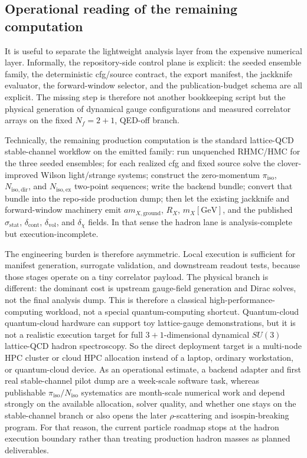 \documentclass[11pt]{article}
\begin{document}
\subsection{Operational reading of the remaining computation}

It is useful to separate the lightweight analysis layer from the expensive numerical layer.
Informally, the repository-side control plane is explicit: the seeded ensemble family, the
deterministic cfg/source contract, the export manifest, the jackknife evaluator, the forward-window
selector, and the publication-budget schema are all explicit. The missing step is therefore not
another bookkeeping script but the physical generation of dynamical gauge configurations and
measured correlator arrays on the fixed \(N_f=2+1\), QED-off branch.

Technically, the remaining production computation is the standard lattice-QCD stable-channel
workflow on the emitted family: run unquenched RHMC/HMC for the three seeded ensembles; for each
realized cfg and fixed source solve the clover-improved Wilson light/strange systems; construct the
zero-momentum \(\pi_{\mathrm{iso}}\), \(N_{\mathrm{iso,dir}}\), and \(N_{\mathrm{iso,ex}}\)
two-point sequences; write the backend bundle; convert that bundle into the repo-side production
dump; then let the existing jackknife and forward-window machinery emit
\(a m_{X,\mathrm{ground}}\), \(R_X\), \(m_X[\mathrm{GeV}]\), and the published
\(\sigma_{\mathrm{stat}}\), \(\delta_{\mathrm{cont}}\), \(\delta_{\mathrm{vol}}\), and
\(\delta_{\chi}\) fields. In that sense the hadron lane is analysis-complete but
execution-incomplete.

The engineering burden is therefore asymmetric. Local execution is sufficient for manifest
generation, surrogate validation, and downstream readout tests, because those stages operate on a
tiny correlator payload. The physical branch is different: the dominant cost is upstream
gauge-field generation and Dirac solves, not the final analysis dump. This is therefore a classical
high-performance-computing workload, not a special quantum-computing shortcut. Quantum-cloud
quantum-cloud hardware can support toy lattice-gauge demonstrations, but it is not a
realistic execution target for full \(3+1\)-dimensional dynamical \(SU(3)\) lattice-QCD hadron
spectroscopy. So the direct deployment target is a multi-node HPC cluster or cloud HPC allocation
instead of a laptop, ordinary workstation, or quantum-cloud device. As an operational estimate, a backend adapter and first real stable-channel pilot dump
are a week-scale software task, whereas publishable \(\pi_{\mathrm{iso}}/N_{\mathrm{iso}}\)
systematics are month-scale numerical work and depend strongly on the available allocation, solver
quality, and whether one stays on the stable-channel branch or also opens the later
\(\rho\)-scattering and isospin-breaking program. For that reason, the current particle roadmap
stops at the hadron execution boundary rather than treating production hadron masses as planned
deliverables.
\end{document}
